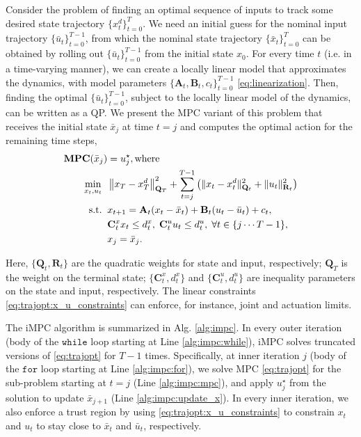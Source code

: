 Consider the problem of finding an optimal sequence of inputs to track some desired state trajectory $\{x^d_t\}_{t=0}^T$. We need an initial guess for the nominal input trajectory $\{\bar{u}_t\}^{T-1}_{t=0}$, from which the nominal state trajectory $\{\bar{x}_t\}^T_{t=0}$ can be obtained by rolling out $\{\bar{u}_t\}^{T-1}_{t=0}$ from the initial state $x_0$. For every time $t$ (i.e. in a time-varying manner), we can create a locally linear model that approximates the dynamics, with model parameters $\{\mathbf{A}_t,\mathbf{B}_t,c_t\}_{t=0}^{T-1}$ \eqref{eq:linearization}. Then, finding the optimal $\{\bar{u}_t\}^{T-1}_{t=0}$, subject to the locally linear model of the dynamics, can be written as a QP. We present the MPC variant of this problem that receives the initial state $\bar{x}_j$ at time $t=j$ and computes the optimal action for the remaining time steps,
\begin{subequations}
\label{eq:trajopt}
\begin{align}
\textbf{MPC}(\bar{x}_j) & = u^\star_j, \text{where}\\
\min_{x_t,u_t}\;\; & \left\lVert{x_T-x_T^d}\right\rVert_{\mathbf{Q}_T}^2 + \sum^{T-1}_{t=j} \left(\|x_t - x^d_t\|^2_{\mathbf{Q}_t} + \|u_t\|^2_{\mathbf{R}_t}\right)\\
\text{s.t.}\;\; & x_{t+1} = \mathbf{A}_t(x_t-\bar{x}_t) + \mathbf{B}_t(u_t - \bar{u}_t) + c_t,\\
& \mathbf{C}^x_t x_t\leq d^x_t,\; \mathbf{C}^u_t u_t \leq d^u_t, \; \forall t\in\{j \cdots T-1\},\\
& x_j = \bar{x}_j.
\label{eq:trajopt:x_u_constraints}
\end{align}
\end{subequations}

Here, $\{\mathbf{Q}_t,\mathbf{R}_t\}$ are the quadratic weights for state and input, respectively; $\mathbf{Q}_T$ is the weight on the terminal state; $\{\mathbf{C}^x_t,d^x_t\}$ and $\{\mathbf{C}^u_t,d^u_t\}$ are inequality parameters on the state and input, respectively. The linear constraints \eqref{eq:trajopt:x_u_constraints} can enforce, for instance, joint and actuation limits.

The iMPC algorithm is summarized in Alg. \ref{alg:impc}. 
In every outer iteration (body of the $\mathtt{while}$ loop starting at Line \ref{alg:impc:while}), iMPC solves truncated versions of \eqref{eq:trajopt} for $T - 1$ times. Specifically, at inner iteration $j$ (body of the $\mathtt{for}$ loop starting at Line \ref{alg:impc:for}), we solve MPC \eqref{eq:trajopt} for the sub-problem starting at $t=j$ (Line \ref{alg:impc:mpc}), and apply $u_j^\star$ from the solution to update $\bar{x}_{j+1}$ (Line \ref{alg:impc:update_x}). In every inner iteration, we also enforce a trust region by using \eqref{eq:trajopt:x_u_constraints} to constrain $x_t$ and $u_t$ to stay close to $\bar{x}_t$ and $\bar{u}_t$, respectively.


